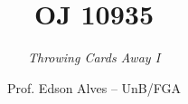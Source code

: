 \title{OJ 10935}
\subtitle{\textit{Throwing Cards Away I}}
\author{Prof. Edson Alves -- UnB/FGA}
\date{}
